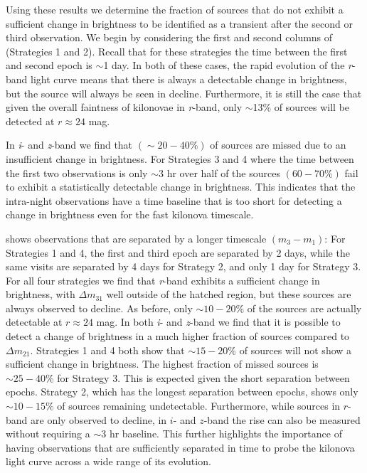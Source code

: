 \clearpage
Using these results we determine the fraction of sources that do not exhibit a sufficient change in brightness to be identified as a transient after the second or third observation. We begin by considering the first and second columns of  (Strategies 1 and 2). Recall that for these strategies the time between the first and second epoch is $\sim$1 day. In both of these cases, the rapid evolution of the {\em r}-band light curve means that there is always a detectable change in brightness, but the source will always be seen in decline. Furthermore, it is still the case that given the overall faintness of kilonovae in {\em r}-band, only $\sim$13\% of sources will be detected at $r\approx24$ mag.

In {\em i}- and {\em z}-band we find that $(\sim 20-40\%)$ of sources are missed due to an insufficient change in brightness. For Strategies 3 and 4 where the time between the first two observations is only $\sim$3 hr over half of the sources $(60-70\%)$ fail to exhibit a statistically detectable change in brightness. This indicates that the intra-night observations have a time baseline that is too short for detecting a change in brightness even for the fast kilonova timescale.

 shows observations that are separated by a longer timescale $(m_3 - m_1)$: For Strategies 1 and 4, the first and third epoch are separated by 2 days, while the same visits are separated by 4 days for Strategy 2, and only 1 day for Strategy 3. For all four strategies we find that {\em r}-band exhibits a sufficient change in brightness, with $\Delta m_{31}$ well outside of the hatched region, but these sources are always observed to decline. As before, only $\sim10-20$\% of the sources are actually detectable at $r\approx24$ mag. In both {\em i}- and {\em z}-band we find that it is possible to detect a change of brightness in a much higher fraction of sources compared to $\Delta m_{21}$. Strategies 1 and 4 both show that $\sim 15-20\%$ of sources will not show a sufficient change in brightness. The highest fraction of missed sources is $\sim 25-40\%$ for Strategy 3. This is expected given the short separation between epochs. Strategy 2, which has the longest separation between epochs, shows only $\sim 10-15 \%$ of sources remaining undetectable. Furthermore, while sources in $r$-band are only observed to decline, in $i$- and $z$-band the rise can also be measured without requiring a $\sim$3 hr baseline. This further highlights the importance of having observations that are sufficiently separated in time to probe the kilonova light curve across a wide range of its evolution.

